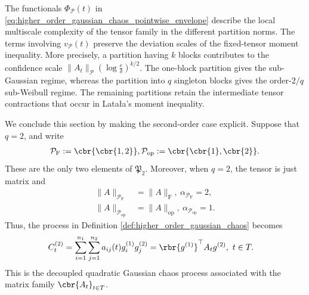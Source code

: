 \documentclass[11pt]{article}
\begin{document}
The functionals $\Phi_{\mathcal P}(t)$ in
\eqref{eq:higher_order_gaussian_chaos_pointwise_envelope} describe the
local multiscale complexity of the tensor family in the different
partition norms. The terms involving $v_{\mathcal P}(t)$ preserve the
deviation scales of the fixed-tensor moment inequality. More precisely,
a partition having $k$ blocks contributes to the confidence scale $\|A_t\|_{\mathcal P}
\left(
\log\frac{e}{\delta}
\right)^{k/2}$. The one-block partition gives the sub-Gaussian regime, whereas the
partition into $q$ singleton blocks gives the order-$2/q$ sub-Weibull
regime. The remaining partitions retain the intermediate tensor
contractions that occur in Lata{\l}a's moment inequality.

We conclude this section by making the second-order case explicit. Suppose
that $q=2$, and write
\begin{align*}
\mathcal P_{\mathrm F}
:=
\cbr{\cbr{1,2}},
\mathcal P_{\mathrm{op}}:=
\cbr{\cbr{1},\cbr{2}}.
\end{align*}
These are the only two elements of $\mathfrak P_2$. Moreover, when $q=2$, the tensor is just matrix and
\begin{align*}
\|A\|_{\mathcal P_{\mathrm F}}&=
\|A\|_{\mathrm F},\ 
\alpha_{\mathcal P_{\mathrm F}}=2,\\
\|A\|_{\mathcal P_{\mathrm{op}}}&=
\|A\|_{\mathrm{op}},\ 
\alpha_{\mathcal P_{\mathrm{op}}}=1.
\end{align*}
Thus, the process in Definition
\ref{def:higher_order_gaussian_chaos} becomes
\begin{align}
C_t^{(2)}
&=
\sum_{i=1}^{n_1}\sum_{j=1}^{n_2}
a_{ij}(t)g_i^{(1)}g_j^{(2)}
=
\rbr{g^{(1)}}^\top A_tg^{(2)},
\ t\in T.
\label{eq:decoupled_quadratic_gaussian_chaos}
\end{align}
This is the decoupled quadratic Gaussian chaos process associated with the
matrix family $\cbr{A_t}_{t\in T}$.
\end{document}
